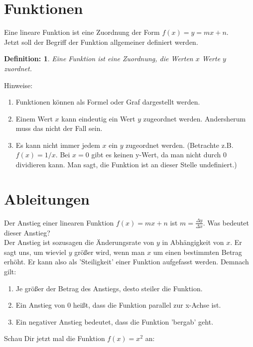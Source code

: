 \documentclass[a4paper, twocolumn]{article}
\newtheorem*{definition}{Definition:}
\begin{document}
\begin{small}

\section*{Funktionen}
Eine lineare Funktion ist eine Zuordnung der Form $f(x)=y = mx+n$.\\
Jetzt soll der Begriff der Funktion allgemeiner definiert werden.
\begin{definition}
Eine Funktion ist eine Zuordnung, die Werten $x$ Werte $y$ zuordnet.
\end{definition}
Hinweise:
\begin{enumerate}
\itemsep0em
    \item Funktionen können als Formel oder Graf dargestellt werden. 
    \item Einem Wert $x$ kann eindeutig ein Wert $y$ zugeordnet werden. Andersherum muss das nicht der Fall sein.
    \item Es kann nicht immer jedem $x$ ein $y$ zugeordnet werden. (Betrachte z.B. $f(x)=1/x$. Bei $x=0$ gibt es keinen y-Wert, da man nicht durch 0 dividieren kann. Man sagt, die Funktion ist an dieser Stelle undefiniert.)
\end{enumerate}

\section*{Ableitungen}
Der Anstieg einer linearen Funktion $f(x) = mx+n$ ist $m = \frac{\Delta y}{\Delta x}$.
Was bedeutet dieser Anstieg?\\
Der Anstieg ist sozusagen die Änderungsrate von $y$ in Abhängigkeit von $x$. Er sagt uns, um wieviel $y$ größer wird, wenn man $x$ um einen bestimmten Betrag erhöht. Er kann also als 'Steiligkeit' einer Funktion aufgefasst werden. Demnach gilt:
\begin{enumerate}
\itemsep0em
    \item Je größer der Betrag des Anstiegs, desto steiler die Funktion.
    \item Ein Anstieg von 0 heißt, dass die Funktion parallel zur x-Achse ist.
    \item Ein negativer Anstieg bedeutet, dass die Funktion 'bergab' geht. 
\end{enumerate}
Schau Dir jetzt mal die Funktion $f(x)=x^2$ an:
\begin{center}
\end{center}
\end{small}
\end{document}
